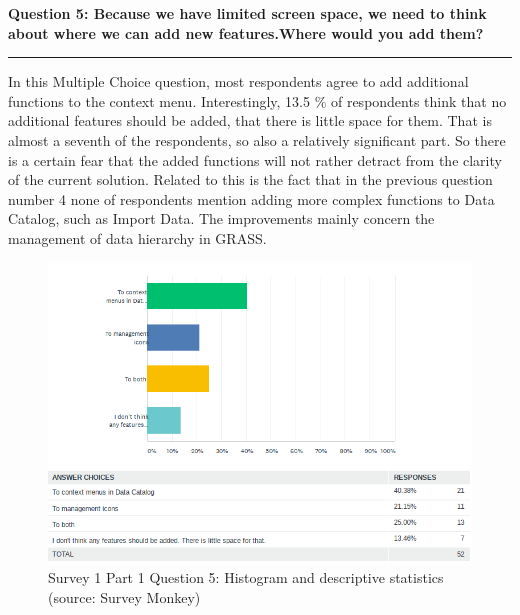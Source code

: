 \documentclass[a4paper,10pt,twoside]{article}
\begin{document}
\newpage
\noindent \textbf{Question 5: Because we have limited screen space, we need to think about where we can add new features.Where would you add them?}
\par\noindent\rule{\textwidth}{0.4pt}
\noindent In this Multiple Choice question, most respondents agree to add additional functions to the context menu. Interestingly, 13.5 \% of respondents think that no additional features should be added, that there is little space for them. That is almost a seventh of the respondents, so also a relatively significant part. So there is a certain fear that the added functions will not rather detract from the clarity of the current solution. Related to this is the fact that in the previous question number 4 none of respondents mention adding more complex functions to Data Catalog, such as Import Data. The improvements mainly concern the management of data hierarchy in GRASS.

\vspace{0.3cm}
\begin{figure}[hbt!] 
\begin{center}
\includegraphics[width=17cm]{../surveys/analyzed_data/survey1_part1_question5_descriptive_stats_sm.png} 
\caption[Survey 1 Part 1 Question 5: Histogram and descriptive statistics]{Survey 1 Part 1 Question 5: Histogram and descriptive statistics (source:  Survey Monkey)}
\label{fig:survey1_part1_question5_descriptive_stats_sm}
\end{center}
\end{figure}
\end{document}
